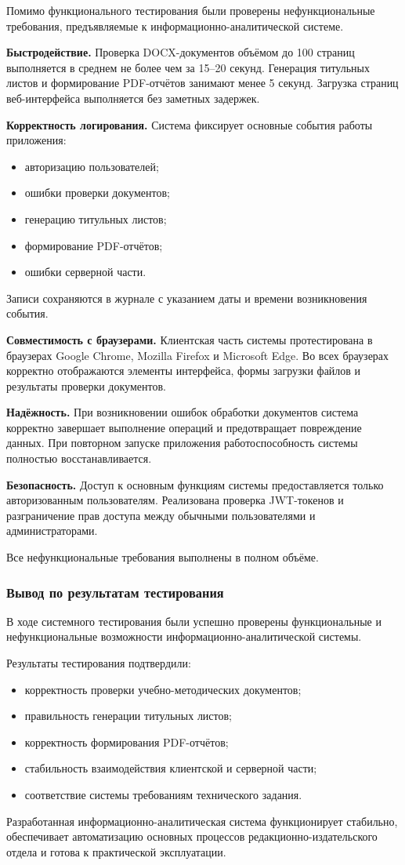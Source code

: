 Помимо функционального тестирования были проверены нефункциональные требования, предъявляемые к информационно-аналитической системе.

\textbf{Быстродействие.}
Проверка DOCX-документов объёмом до 100 страниц выполняется в среднем не более чем за 15–20 секунд. Генерация титульных листов и формирование PDF-отчётов занимают менее 5 секунд. Загрузка страниц веб-интерфейса выполняется без заметных задержек.

\textbf{Корректность логирования.}
Система фиксирует основные события работы приложения:
\begin{itemize}
	\item авторизацию пользователей;
	\item ошибки проверки документов;
	\item генерацию титульных листов;
	\item формирование PDF-отчётов;
	\item ошибки серверной части.
\end{itemize}

Записи сохраняются в журнале с указанием даты и времени возникновения события.

\textbf{Совместимость с браузерами.}
Клиентская часть системы протестирована в браузерах Google Chrome, Mozilla Firefox и Microsoft Edge. Во всех браузерах корректно отображаются элементы интерфейса, формы загрузки файлов и результаты проверки документов.

\textbf{Надёжность.}
При возникновении ошибок обработки документов система корректно завершает выполнение операций и предотвращает повреждение данных. При повторном запуске приложения работоспособность системы полностью восстанавливается.

\textbf{Безопасность.}
Доступ к основным функциям системы предоставляется только авторизованным пользователям. Реализована проверка JWT-токенов и разграничение прав доступа между обычными пользователями и администраторами.

Все нефункциональные требования выполнены в полном объёме.

\subsubsection{Вывод по результатам тестирования}

В ходе системного тестирования были успешно проверены функциональные и нефункциональные возможности информационно-аналитической системы.

Результаты тестирования подтвердили:
\begin{itemize}
	\item корректность проверки учебно-методических документов;
	\item правильность генерации титульных листов;
	\item корректность формирования PDF-отчётов;
	\item стабильность взаимодействия клиентской и серверной части;
	\item соответствие системы требованиям технического задания.
\end{itemize}

Разработанная информационно-аналитическая система функционирует стабильно, обеспечивает автоматизацию основных процессов редакционно-издательского отдела и готова к практической эксплуатации.